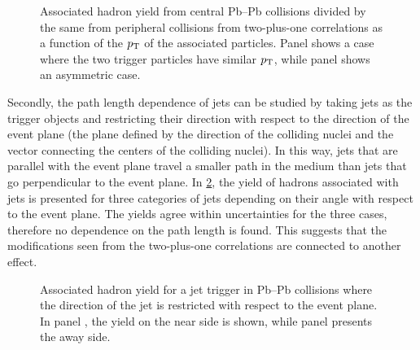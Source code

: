 \documentclass{PoS}
\begin{document}
\begin{figure}[!htbp]
  \caption{Associated hadron yield from central Pb--Pb collisions divided by the same from peripheral collisions from two-plus-one correlations as a function of the $p_{\rm T}$ of the associated particles. Panel \protect{} shows a case where the two trigger particles have similar $p_{\rm T}$, while panel \protect{} shows an asymmetric case.}
  \label{fig:two-plus-one}
\end{figure}

Secondly, the path length dependence of jets can be studied by taking jets as the trigger objects and restricting their direction with respect to the direction of the event plane (the plane defined by the direction of the colliding nuclei and the vector connecting the centers of the colliding nuclei). In this way, jets that are parallel with the event plane travel a smaller path in the medium than jets that go perpendicular to the event plane. In \cref{fig:jet-hadron}, the yield of hadrons associated with jets is presented for three categories of jets depending on their angle with respect to the event plane. The yields agree within uncertainties for the three cases, therefore no dependence on the path length is found. This suggests that the modifications seen from the two-plus-one correlations are connected to another effect.

\begin{figure}[!htbp]
  \caption{Associated hadron yield for a jet trigger in Pb--Pb collisions where the direction of the jet is restricted with respect to the event plane. In panel \protect{}, the yield on the near side is shown, while panel \protect{} presents the away side.}
  \label{fig:jet-hadron}
\end{figure}
\end{document}

